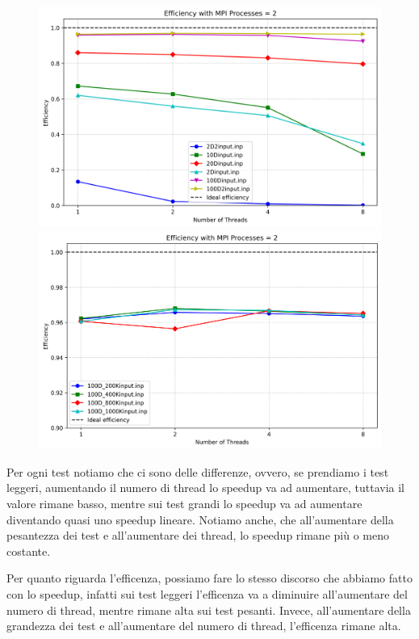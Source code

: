 \documentclass{article}
\begin{document}
\begin{figure}[ht]
\begin{minipage}{0.4\textwidth}
      \centering
      \includegraphics[width=\linewidth]{../test_csv/plots/efficency/plot_omp_mpi_2_small_slurm.png}
    \end{minipage}
    \begin{minipage}{0.4\textwidth}
      \centering
      \includegraphics[width=\linewidth]{../test_csv/plots/efficency/plot_omp_mpi_2_big_slurm.png}
    \end{minipage}
  \end{figure}
  Per ogni test notiamo che ci sono delle differenze, ovvero, se prendiamo i test leggeri, aumentando il numero di thread
  lo speedup va ad aumentare, tuttavia il valore rimane basso, mentre sui test grandi lo speedup va ad aumentare diventando quasi uno
  speedup lineare. Notiamo anche, che all'aumentare della pesantezza 
  dei test e all'aumentare dei thread, lo speedup rimane più o meno costante.

  Per quanto riguarda l'efficenza, possiamo fare lo stesso discorso che abbiamo fatto con lo speedup, infatti sui test leggeri l'efficenza va a diminuire all'aumentare del 
  numero di thread, mentre rimane alta sui test pesanti. Invece, all'aumentare della grandezza dei test e all'aumentare del numero di thread, l'efficenza rimane alta.
\end{document}
